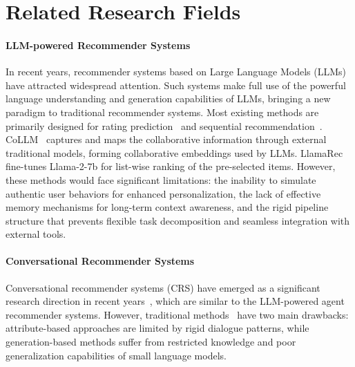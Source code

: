 \section{Related Research Fields}
\paragraph{LLM-powered Recommender Systems} In recent years, recommender systems based on Large Language Models (LLMs) have attracted widespread attention. 
Such systems make full use of the powerful language understanding and generation capabilities of LLMs, bringing a new paradigm to traditional recommender systems.
Most existing methods are primarily designed for rating prediction~\cite{bao2023tallrec} and sequential recommendation~\cite{hou2024large,shao2024ulmrec,zheng2024adapting}.
CoLLM~\cite{zhang2023collm} captures and maps the collaborative information through external traditional models, forming collaborative embeddings used by LLMs. 
LlamaRec~\cite{llamarec} fine-tunes Llama-2-7b for list-wise ranking of the pre-selected items.
However, these methods would face significant limitations: the inability to simulate authentic user behaviors for enhanced personalization, the lack of effective memory mechanisms for long-term context awareness, and the rigid pipeline structure that prevents flexible task decomposition and seamless integration with external tools.

\paragraph{Conversational Recommender Systems}

Conversational recommender systems (CRS) have emerged as a significant research direction in recent years~\cite{jannach2021survey}, which are similar to the LLM-powered agent recommender systems. 
However, traditional methods~\cite{lei2020interactive} have two main drawbacks: attribute-based approaches are limited by rigid dialogue patterns, while generation-based methods suffer from restricted knowledge and poor generalization capabilities of small language models.